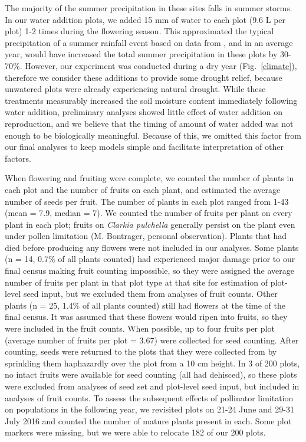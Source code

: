 \documentclass{article}
\begin{document}
The majority of the summer precipitation in these sites falls in summer storms. In our water addition plots, we added 15 mm of water to each plot (9.6 L per plot) 1-2 times during the flowering season. This approximated the typical precipitation of a summer rainfall event based on data from \citet{wang2012climatewna}, and in an average year, would have increased the total summer precipitation in these plots by 30-70\%. However, our experiment was conducted during a dry year (Fig.\ \ref{climate}), therefore we consider these additions to provide some drought relief, because unwatered plots were already experiencing natural drought. While these treatments measurably increased the soil moisture content immediately following water addition, preliminary analyses showed little effect of water addition on reproduction, and we believe that the timing of amount of water added was not enough to be biologically meaningful. Because of this, we omitted this factor from our final analyses to keep models simple and facilitate interpretation of other factors. 

When flowering and fruiting were complete, we counted the number of plants in each plot and the number of fruits on each plant, and estimated the average number of seeds per fruit. The number of plants in each plot ranged from 1-43 (mean = 7.9, median = 7). We counted the number of fruits per plant on every plant in each plot; fruits on \textit{Clarkia pulchella} generally persist on the plant even under pollen limitation (M. Bontrager, personal observation). Plants that had died before producing any flowers were not included in our analyses. Some plants (n = 14, 0.7\% of all plants counted) had experienced major damage prior to our final census making fruit counting impossible, so they were assigned the average number of fruits per plant in that plot type at that site for estimation of plot-level seed input, but we excluded them from analyses of fruit counts. Other plants (n = 25, 1.4\% of all plants counted) still had flowers at the time of the final census. It was assumed that these flowers would ripen into fruits, so they were included in the fruit counts. When possible, up to four fruits per plot (average number of fruits per plot = 3.67) were collected for seed counting. After counting, seeds were returned to the plots that they were collected from by sprinkling them haphazardly over the plot from a 10 cm height. In 3 of 200 plots, no intact fruits were available for seed counting (all had dehisced), so these plots were excluded from analyses of seed set and plot-level seed input, but included in analyses of fruit counts. To assess the subsequent effects of pollinator limitation on populations in the following year, we revisited plots on 21-24 June and 29-31 July 2016 and counted the number of mature plants present in each. Some plot markers were missing, but we were able to relocate 182 of our 200 plots.
\end{document}
